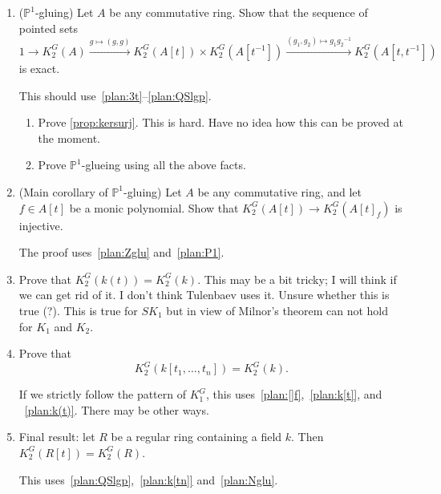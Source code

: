 \documentclass[oneside,12pt]{amsart}
\numberwithin{equation}{section}
\numberwithin{lem}{section}
\theoremstyle{definition}
\theoremstyle{remark}
\DeclareMathOperator{\St}{St^G}
\newcommand{\Pro}{\mathbb{P}}
\newcommand{\st}{\scriptstyle}
\begin{document}
\begin{enumerate}
(i) If $Ah+B=A$, i.e. the natural map $B\to A/Ah$ is surjective, then for any $x\in \St(A_h)$ there exist
$y\in \St(A)$ and $z\in \St(B_h)$ such that
$x=F_h(y)z$.

(ii) If moreover $Ah\cap B=Bh$, i.e. $B/Bh\to A/Ah$ is an isomorphism, and $h$ is not a zero divisor in $A$, then
the sequence of pointed sets
$$
K_2^G(B)\xrightarrow{\st g\mapsto (F_h(g),g)} K_2^G(B_h)\times K_2^G(A)\xrightarrow{\st (g_1,g_2)\mapsto g_1F_h(g_2)^{-1}}
K_2^G(A_h)
$$
is exact.

This should use something from the proof of~\eqref{plan:QSlgp} or~\eqref{plan:Zglu}; see~\cite[Lemma 3.4]{St-poly}.

\item\label{plan:P1} ($\Pro^1$-gluing) Let $A$ be any commutative ring. Show that the sequence of pointed sets
$$
1\longrightarrow K_2^G(A)\xrightarrow{\st g\mapsto (g,g)} K_2^G(A[t])\times K_2^G(A[t^{-1}])
\xrightarrow{\st (g_1,g_2)\mapsto g_1{g_2}^{-1}} K_2^G(A[t,t^{-1}])
$$
is exact.

This should use~\eqref{plan:3t}--\eqref{plan:QSlgp}.

\begin{enumerate}
 \item Prove \cref{prop:kersurj}. This is hard. Have no idea how this can be proved at the moment. 
 \item Prove $\Pro^1$-glueing using all the above facts.
\end{enumerate}

\item\label{plan:[]f} (Main corollary of $\Pro^1$-gluing) Let $A$ be any commutative ring, and let $f\in A[t]$ be a monic polynomial. Show that
$K_2^G(A[t])\to K_2^G(A[t]_f)$ is injective.

The proof uses~\eqref{plan:Zglu} and~\eqref{plan:P1}.

\item\label{plan:k(t)} Prove that $K_2^G(k(t))=K_2^G(k)$. This may be a bit tricky; I will think if we can get rid of it. I don't think Tulenbaev uses it.
Unsure whether this is true (?). This is true for $SK_1$ but in view of Milnor's theorem can not hold for $K_1$ and $K_2$.

\item\label{plan:k[tn]} Prove that
$$K_2^G(k[t_1,\ldots,t_n])=K_2^G(k).$$

If we strictly follow the pattern of $K_1^G$, this uses~\eqref{plan:[]f},~\eqref{plan:k[t]}, and
~\eqref{plan:k(t)}. There may be other ways.

\item \label{plan:final} Final result: let $R$ be a regular ring containing a field $k$. Then $K_2^G(R[t])=K_2^G(R)$.

This uses~\eqref{plan:QSlgp},~\eqref{plan:k[tn]} and~\eqref{plan:Nglu}.
\end{enumerate}
\end{document}

